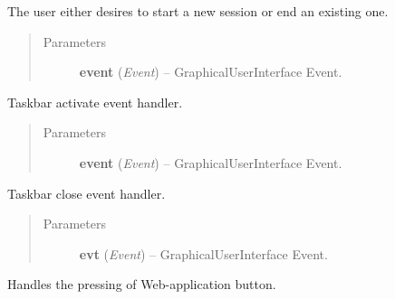 \documentclass[letterpaper,10pt,english]{sphinxmanual}
\begin{document}
\begin{fulllineitems}
\begin{fulllineitems}
The user either desires to start a new session or end
an existing one.
\begin{quote}\begin{description}
\item[{Parameters}] \leavevmode
\textbf{event} (\emph{Event}) -- GraphicalUserInterface Event.

\end{description}\end{quote}

\end{fulllineitems}


\begin{fulllineitems}
\label{diwacs:diwacs.GraphicalUserInterface.OnTaskBarActivate}
Taskbar activate event handler.
\begin{quote}\begin{description}
\item[{Parameters}] \leavevmode
\textbf{event} (\emph{Event}) -- GraphicalUserInterface Event.

\end{description}\end{quote}

\end{fulllineitems}


\begin{fulllineitems}
\label{diwacs:diwacs.GraphicalUserInterface.OnTaskBarClose}
Taskbar close event handler.
\begin{quote}\begin{description}
\item[{Parameters}] \leavevmode
\textbf{evt} (\emph{Event}) -- GraphicalUserInterface Event.

\end{description}\end{quote}

\end{fulllineitems}


\begin{fulllineitems}
\label{diwacs:diwacs.GraphicalUserInterface.OnWABtn}
Handles the pressing of Web-application button.


\end{fulllineitems}
\end{fulllineitems}
\end{document}
